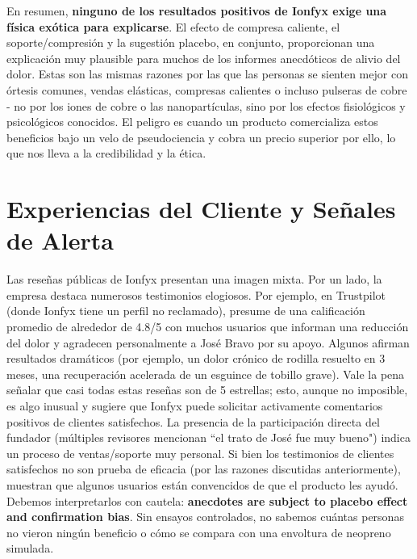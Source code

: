 \documentclass{article}
\begin{document}
En resumen, \textbf{ninguno de los resultados positivos de Ionfyx exige una física exótica para explicarse}. El efecto de compresa caliente, el soporte/compresión y la sugestión placebo, en conjunto, proporcionan una explicación muy plausible para muchos de los informes anecdóticos de alivio del dolor. Estas son las mismas razones por las que las personas se sienten mejor con órtesis comunes, vendas elásticas, compresas calientes o incluso pulseras de cobre - no por los iones de cobre o las nanopartículas, sino por los efectos fisiológicos y psicológicos conocidos. El peligro es cuando un producto comercializa estos beneficios bajo un velo de pseudociencia y cobra un precio superior por ello, lo que nos lleva a la credibilidad y la ética.

\section{Experiencias del Cliente y Señales de Alerta}

Las reseñas públicas de Ionfyx presentan una imagen mixta. Por un lado, la empresa destaca numerosos testimonios elogiosos. Por ejemplo, en Trustpilot (donde Ionfyx tiene un perfil no reclamado), presume de una calificación promedio de alrededor de 4.8/5 con muchos usuarios que informan una reducción del dolor y agradecen personalmente a José Bravo por su apoyo. Algunos afirman resultados dramáticos (por ejemplo, un dolor crónico de rodilla resuelto en 3 meses, una recuperación acelerada de un esguince de tobillo grave). Vale la pena señalar que casi todas estas reseñas son de 5 estrellas; esto, aunque no imposible, es algo inusual y sugiere que Ionfyx puede solicitar activamente comentarios positivos de clientes satisfechos. La presencia de la participación directa del fundador (múltiples revisores mencionan “el trato de José fue muy bueno") indica un proceso de ventas/soporte muy personal. Si bien los testimonios de clientes satisfechos no son prueba de eficacia (por las razones discutidas anteriormente), muestran que algunos usuarios están convencidos de que el producto les ayudó. Debemos interpretarlos con cautela: \textbf{anecdotes are subject to placebo effect and confirmation bias}. Sin ensayos controlados, no sabemos cuántas personas no vieron ningún beneficio o cómo se compara con una envoltura de neopreno simulada.
\end{document}
